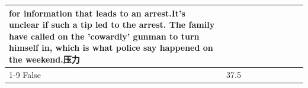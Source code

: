 \begin{table}[H]
\begin{tabular}{lllrlllll}
for information that leads to an arrest.It's unclear if such a tip led to the arrest. The family have called on the 'cowardly' gunman to turn himself in, which is what police say happened on the weekend.压力 \\
\cline{1-9}
False & 37.5%
\end{tabular}
\end{table}
